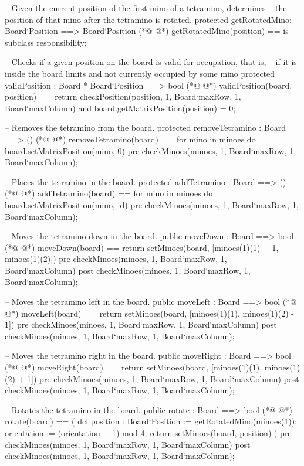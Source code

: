 \begin{vdmpp}[breaklines=true]
  -- Given the current position of the first mino of a tetramino, determines
  -- the position of that mino after the tetramino is rotated.
  protected getRotatedMino: Board`Position ==> Board`Position
(*@
\label{getRotatedMino:129}
@*)
  getRotatedMino(position) ==
   is subclass responsibility;

  -- Checks if a given position on the board is valid for occupation, that is, 
  -- if it is inside the board limits and not currently occupied by some mino
  protected validPosition : Board * Board`Position ==> bool
(*@
\label{validPosition:135}
@*)
  validPosition(board, position) == 
   return checkPosition(position, 1, Board`maxRow, 1, Board`maxColumn) 
    and board.getMatrixPosition(position) = 0;

  -- Removes the tetramino from the board.
  protected removeTetramino : Board ==> ()
(*@
\label{removeTetramino:141}
@*)
  removeTetramino(board) ==
   for mino in minoes do
    board.setMatrixPosition(mino, 0)
  pre checkMinoes(minoes, 1, Board`maxRow, 1, Board`maxColumn);

  -- Places the tetramino in the board.
  protected addTetramino : Board ==> ()
(*@
\label{addTetramino:148}
@*)
  addTetramino(board) ==
   for mino in minoes do
    board.setMatrixPosition(mino, id)
  pre checkMinoes(minoes, 1, Board`maxRow, 1, Board`maxColumn);

  -- Moves the tetramino down in the board.
  public moveDown : Board ==> bool
(*@
\label{moveDown:155}
@*)
  moveDown(board) == 
   return setMinoes(board, [minoes(1)(1) + 1, minoes(1)(2)])
  pre checkMinoes(minoes, 1, Board`maxRow, 1, Board`maxColumn)
  post checkMinoes(minoes, 1, Board`maxRow, 1, Board`maxColumn);
     
  -- Moves the tetramino left in the board.
  public moveLeft : Board ==> bool
(*@
\label{moveLeft:162}
@*)
  moveLeft(board) == 
   return setMinoes(board, [minoes(1)(1), minoes(1)(2) - 1])
  pre checkMinoes(minoes, 1, Board`maxRow, 1, Board`maxColumn)
  post checkMinoes(minoes, 1, Board`maxRow, 1, Board`maxColumn);
  
  -- Moves the tetramino right in the board.
  public moveRight : Board ==> bool
(*@
\label{moveRight:169}
@*)
  moveRight(board) == 
   return setMinoes(board, [minoes(1)(1), minoes(1)(2) + 1])
  pre checkMinoes(minoes, 1, Board`maxRow, 1, Board`maxColumn)
  post checkMinoes(minoes, 1, Board`maxRow, 1, Board`maxColumn);

  -- Rotates the tetramino in the board.
  public rotate : Board ==> bool
(*@
\label{rotate:176}
@*)
  rotate(board) == (
   dcl position : Board`Position := getRotatedMino(minoes(1));
   orientation := (orientation + 1) mod 4;
   return setMinoes(board, position)
  )
  pre checkMinoes(minoes, 1, Board`maxRow, 1, Board`maxColumn)
  post checkMinoes(minoes, 1, Board`maxRow, 1, Board`maxColumn);
  

\end{vdmpp}

